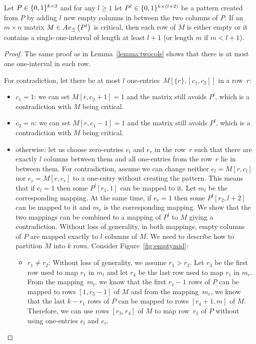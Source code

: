 \begin{lemma}
\label{lemma:maxmult}
Let $P\in\{0,1\}^{k\times2}$ and for any $l\geq1$ let $P^l\in\{0,1\}^{k\times(l+2)}$ be a pattern created from $P$ by adding $l$ new empty columns in between the two columns of $P$. If an $m\times n$ matrix $M\in Av_{\preceq}\left(P^l\right)$ is critical, then each row of $M$ is either empty or it contains a single one-interval of length at least $l+1$ (or length $m$ if $m<l+1$).
\end{lemma}
\begin{proof}
The same proof as in Lemma~\ref{lemma:twocols} shows that there is at most one one-interval in each row.

For contradiction, let there be at most $l$ one-entries~$M[\{r\},[c_1,c_2]]$ in a row~$r$:
\begin{itemize}
	\item $c_1=1$: we can set $M[r,c_2+1]=1$ and the matrix still avoids $P^l$, which is a contradiction with $M$ being critical.
	\item $c_2=n$: we can set $M[r,c_1-1]=1$ and the matrix still avoids $P^l$, which is a contradiction with $M$ being critical.
	\item otherwise: let us choose zero-entries $e_l$ and $e_r$ in the row~$r$ such that there are exactly $l$ columns between them and all one-entries from the row~$r$ lie in between them. For contradiction, assume we can change neither $e_l=M[r,c_l]$ nor $e_r=M[r,c_r]$ to a one-entry without creating the pattern. This means that if $e_l=1$ then some $P^l[r_1,1]$ can be mapped to it. Let $m_l$ be the corresponding mapping. At the same time, if $e_r=1$ then some $P^l[r_2,l+2]$ can be mapped to it and $m_r$ is the corresponding mapping. We show that the two mappings can be combined to a mapping of $P^l$ to $M$ giving a contradiction. Without loss of generality, in both mappings, empty columns of $P$ are mapped exactly to $l$ columns of $M$. We need to describe how to partition $M$ into $k$ rows. Consider Figure~\ref{fig:emptymid}:
	\begin{itemize}
		\item $r_1\neq r_2$: Without loss of generality, we assume $r_1>r_2$. Let $r_3$ be the first row used to map $r_1$ in $m_l$ and let $r_4$ be the last row used to map $r_1$ in $m_r$. From the mapping~$m_l$, we know that the first $r_1-1$ rows of $P$ can be mapped to rows $[1,r_3-1]$ of $M$ and from the mapping~$m_r$, we know that the last $k-r_1$ rows of $P$ can be mapped to rows $[r_4+1,m]$ of $M$. Therefore, we can use rows $[r_3,r_4]$ of $M$ to map row~$r_1$ of $P$ without using one-entries $e_l$ and $e_r$.

\end{itemize}
\end{itemize}
\end{proof}
